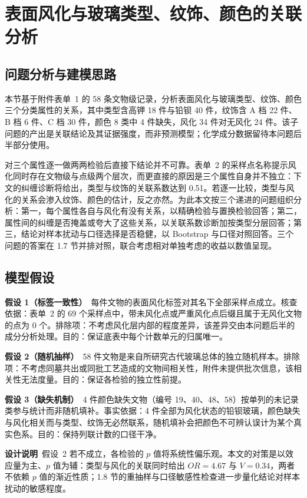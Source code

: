 \documentclass[12pt]{ctexart}
\begin{document}
\section{表面风化与玻璃类型、纹饰、颜色的关联分析}

\subsection{问题分析与建模思路}

本节基于附件表单~1 的 58 条文物级记录，分析表面风化与玻璃类型、纹饰、颜色三个分类属性的关系，其中类型含高钾 18 件与铅钡 40 件，纹饰含 A 档 22 件、B 档 6 件、C 档 30 件，颜色 8 类中 4 件缺失，风化 34 件对无风化 24 件。该子问题的产出是关联结论及其证据强度，而非预测模型；化学成分数据留待本问题后半部分使用。

对三个属性逐一做两两检验后直接下结论并不可靠。表单~2 的采样点名称提示风化同时存在文物级与点级两个层次，而更直接的原因是三个属性自身并不独立：下文的纠缠诊断将给出，类型与纹饰的关联系数达到 0.51。若逐一比较，类型与风化的关系会渗入纹饰、颜色的估计，反之亦然。为此本文按三个递进的问题组织分析：第一，每个属性各自与风化有没有关系，以精确检验与置换检验回答；第二，属性间的纠缠是否掩盖或夸大了这些关系，以关联系数诊断加按类型分层回答；第三，结论对样本扰动与口径选择是否稳健，以 Bootstrap 与口径对照回答。三个问题的答案在 1.7 节并排对照，联合考虑相对单独考虑的收益以数值呈现。

\subsection{模型假设}

\textbf{假设 1（标签一致性）}\ 每件文物的表面风化标签对其名下全部采样点成立。核查依据：表单~2 的 69 个采样点中，带未风化点或严重风化点后缀且属于无风化文物的点为 0 个。排除项：不考虑风化层内部的程度差异，该差异交由本问题后半的成分分析处理。目的：保证底表中每个计数单元的归属唯一。

\textbf{假设 2（随机抽样）}\ 58 件文物是来自所研究古代玻璃总体的独立随机样本。排除项：不考虑同墓共出或同批工艺造成的文物间相关性，附件未提供批次信息，该相关性无法度量。目的：保证各检验的独立性前提。

\textbf{假设 3（缺失机制）}\ 4 件颜色缺失文物（编号 19、40、48、58）按单列的未记录类参与统计而非随机填补。事实依据：4 件全部为风化状态的铅钡玻璃，颜色缺失与风化相关而与类型、纹饰无必然联系，随机填补会把颜色不可辨认误计为某个真实色系。目的：保持列联计数的口径干净。

\textbf{设计说明}\ 假设~2 若不成立，各检验的 $p$ 值将系统性偏乐观。本文的对策是以效应量为主、$p$ 值为辅：类型与风化的关联同时给出 $OR=4.67$ 与 $V=0.34$，两者不依赖 $p$ 值的渐近性质；1.8 节的重抽样与口径敏感性检查进一步量化结论对样本扰动的敏感程度。
\end{document}
